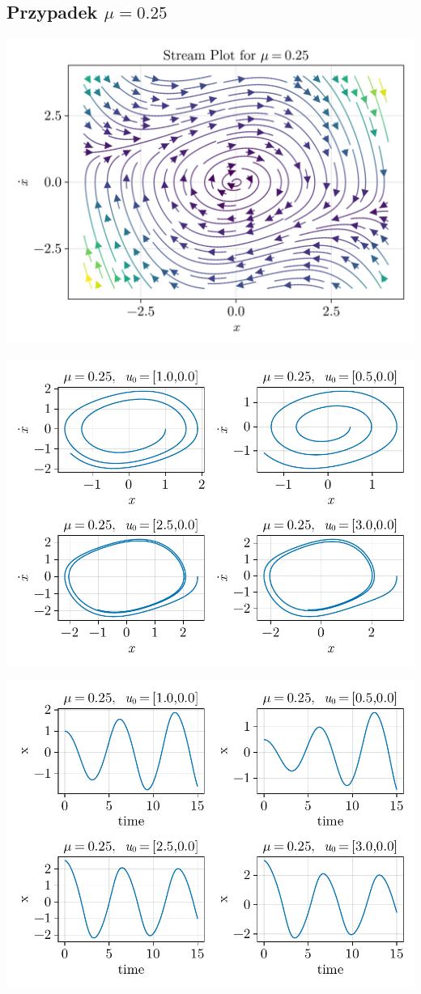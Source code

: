 \clearpage

%
%
\subsection{Przypadek $\mu = 0.25$}
\includegraphics[width=\textwidth]{out/stream_05.png}

\includegraphics[width=\textwidth]{out/phase_05.pdf}

\includegraphics[width=\textwidth]{out/xfromt_05.pdf}

